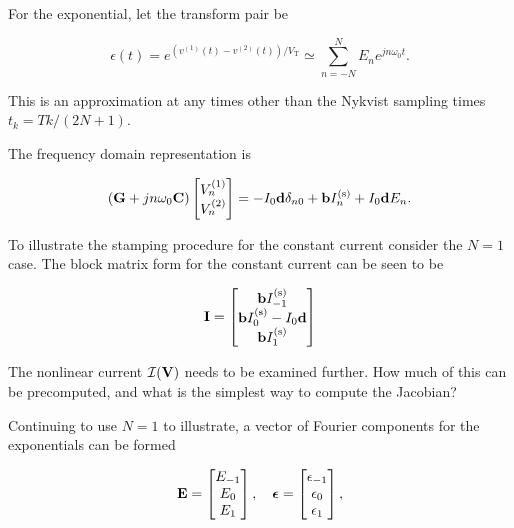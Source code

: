For the exponential, let the transform pair be

\begin{equation}\label{eqn:ece1254projectReport:1300}
\epsilon(t) =
e^{ (v^{(1)}(t) - v^{(2)}(t))/V_{\textrm{T}}}
\simeq
\sum_{n=-N}^N E_n e^{ j n \omega_0 t }.
\end{equation}

This is an approximation at any times other than the Nykvist sampling times \( t_k = T k/(2 N + 1) \).

The frequency domain representation is

\begin{equation}\label{eqn:ece1254projectReport:820}
\lr{ \BG + j n \omega_0 \BC }
\begin{bmatrix}
V^{(1)}_n \\
V^{(2)}_n \\
\end{bmatrix}
=
-I_0 \Bd \delta_{n 0}
+
\Bb I^{(\textrm{s})}_n
+ I_0 \Bd E_n.
\end{equation}

To illustrate the stamping procedure for the constant current consider the \( N = 1 \) case.
The block matrix form for the constant current can be seen to be

\begin{equation}\label{eqn:ece1254projectReport:840}
\BI
=
\begin{bmatrix}
\Bb I^{(\textrm{s})}_{-1} \\
\Bb I^{(\textrm{s})}_{0} - I_0 \Bd \\
\Bb I^{(\textrm{s})}_{1} \\
\end{bmatrix}
\end{equation}

The nonlinear current \( {\mathcal{I}}(\mathbf{V}) \) needs to be examined further.
How much of this can be precomputed, and what is the simplest way to compute the Jacobian?

Continuing to use \( N = 1 \) to illustrate, a vector of Fourier components for the exponentials can be formed

\begin{equation}\label{eqn:ece1254projectReport:880}
\BE =
\begin{bmatrix}
E_{-1} \\
E_{0} \\
E_{1} \\
\end{bmatrix}, \quad
\Bepsilon =
\begin{bmatrix}
\epsilon_{-1} \\
\epsilon_{0} \\
\epsilon_{1} \\
\end{bmatrix},
\end{equation}

